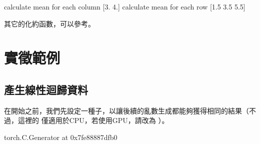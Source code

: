 \documentclass[letterpaper,10pt,english]{sphinxmanual}
\begin{document}
\begin{sphinxVerbatim}[commandchars=\\\{\}]
calculate mean for each column 
 [3. 4.]
calculate mean for each row 
 [1.5 3.5 5.5]
\end{sphinxVerbatim}

其它的化約函數，可以參考。


\section{實徵範例}
\label{\detokenize{notebook/lab-torch-tensor:id13}}

\subsection{產生線性迴歸資料}
\label{\detokenize{notebook/lab-torch-tensor:id14}}
在開始之前，我們先設定一種子，以讓後續的亂數生成都能夠獲得相同的結果（不過，這裡的  僅適用於CPU，若使用GPU，請改為 ）。

\begin{sphinxVerbatim}[commandchars=\\\{\}]
\end{sphinxVerbatim}

\begin{sphinxVerbatim}[commandchars=\\\{\}]
\PYGZlt{}torch.\PYGZus{}C.Generator at 0x7fe88887dfb0\PYGZgt{}
\end{sphinxVerbatim}
\end{document}
